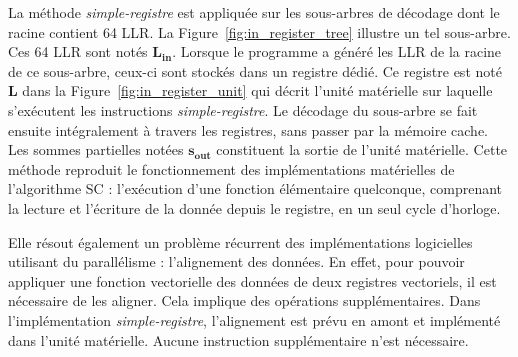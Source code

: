 La méthode \textit{simple-registre} est appliquée sur les sous-arbres de décodage dont le \noeud racine contient 64 LLR. La Figure~\ref{fig:in_register_tree} illustre un tel sous-arbre.
Ces 64 LLR sont notés $\mathbold{L_{in}}$.
Lorsque le programme a généré les LLR de la racine de ce sous-arbre, ceux-ci sont stockés dans un registre dédié.
Ce registre est noté $\mathbold{L}$ dans la Figure~\ref{fig:in_register_unit} qui décrit l'unité matérielle sur laquelle s'exécutent les instructions \textit{simple-registre}.
Le décodage du sous-arbre se fait ensuite intégralement à travers les registres, sans passer par la mémoire cache.
Les sommes partielles notées $\mathbold{s_{out}}$ constituent la sortie de l'unité matérielle.
Cette méthode reproduit le fonctionnement des implémentations matérielles de l'algorithme SC : l'exécution d'une fonction élémentaire quelconque, comprenant la lecture et l'écriture de la donnée depuis le registre, en un seul cycle d'horloge.





Elle résout également un problème récurrent des implémentations logicielles utilisant du parallélisme : l'alignement des données. En effet, pour pouvoir appliquer une fonction vectorielle des données de deux registres vectoriels, il est nécessaire de les aligner. Cela implique des opérations supplémentaires. Dans l'implémentation \textit{simple-registre}, l'alignement est prévu en amont et implémenté dans l'unité matérielle. Aucune instruction supplémentaire n'est nécessaire. 


